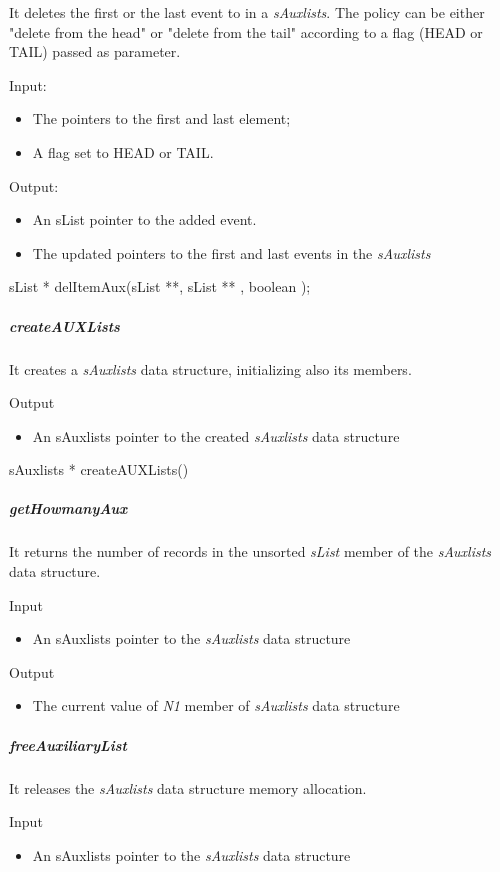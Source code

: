 It deletes the first or the last event to in a \textit{sAuxlists}. The policy can be either "delete from the head" or "delete from the tail" according to a flag (HEAD or TAIL) passed as parameter.

Input:
\begin{itemize} 
\item The pointers to the first and last element;
\item A flag set to HEAD or TAIL.
\end{itemize}
Output:
\begin{itemize}
\item An sList pointer to the added event.
\item The updated pointers to the first and last events in the \textit{sAuxlists}
\end{itemize}
sList * delItemAux(sList **, sList **  , boolean );

\subparagraph{createAUXLists}

It creates a \textit{sAuxlists} data structure, initializing also its members.


Output
\begin{itemize}
\item An sAuxlists pointer to the created \textit{sAuxlists} data structure
\end{itemize}

sAuxlists * createAUXLists()

\subparagraph{getHowmanyAux}

It returns the number of records in the unsorted \textit{sList} member of the \textit{sAuxlists} data structure.

Input
\begin{itemize}
\item An sAuxlists pointer to the \textit{sAuxlists} data structure
\end{itemize}

Output
\begin{itemize}
\item The current value of \textit{N1} member of \textit{sAuxlists} data structure
\end{itemize}

\subparagraph{freeAuxiliaryList}

It releases the \textit{sAuxlists} data structure memory allocation.

Input
\begin{itemize}
\item An sAuxlists pointer to the \textit{sAuxlists} data structure
\end{itemize}


